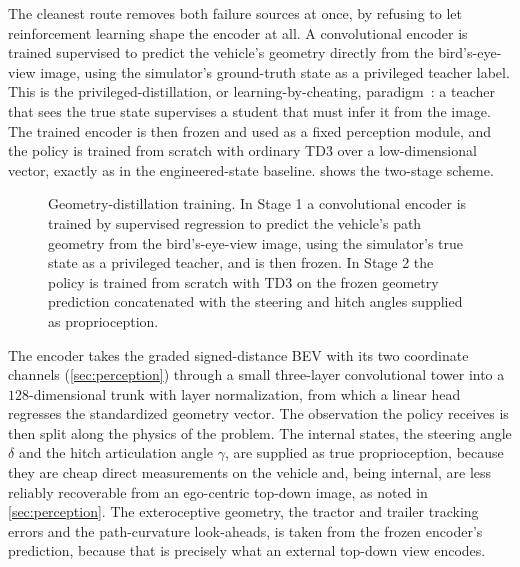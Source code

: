The cleanest route removes both failure sources at once, by refusing to let reinforcement learning shape the encoder at all. A convolutional encoder is trained supervised to predict the vehicle's geometry directly from the bird's-eye-view image, using the simulator's ground-truth state as a privileged teacher label. This is the privileged-distillation, or learning-by-cheating, paradigm~\cite{chen2020cheating}: a teacher that sees the true state supervises a student that must infer it from the image. The trained encoder is then frozen and used as a fixed perception module, and the policy is trained from scratch with ordinary TD3 over a low-dimensional vector, exactly as in the engineered-state baseline.  shows the two-stage scheme.

\begin{figure}[t]
  \centering
  \resizebox{\textwidth}{!}{}
  \caption{Geometry-distillation training. In Stage 1 a convolutional encoder is trained by supervised regression to predict the vehicle's path geometry from the bird's-eye-view image, using the simulator's true state as a privileged teacher, and is then frozen. In Stage 2 the policy is trained from scratch with TD3 on the frozen geometry prediction concatenated with the steering and hitch angles supplied as proprioception.}
  \label{fig:geometry_distillation}
\end{figure}

The encoder takes the graded signed-distance BEV with its two coordinate channels (\cref{sec:perception}) through a small three-layer convolutional tower into a $128$-dimensional trunk with layer normalization, from which a linear head regresses the standardized geometry vector. The observation the policy receives is then split along the physics of the problem. The internal states, the steering angle $\delta$ and the hitch articulation angle $\gamma$, are supplied as true proprioception, because they are cheap direct measurements on the vehicle and, being internal, are less reliably recoverable from an ego-centric top-down image, as noted in \cref{sec:perception}. The exteroceptive geometry, the tractor and trailer tracking errors and the path-curvature look-aheads, is taken from the frozen encoder's prediction, because that is precisely what an external top-down view encodes.

